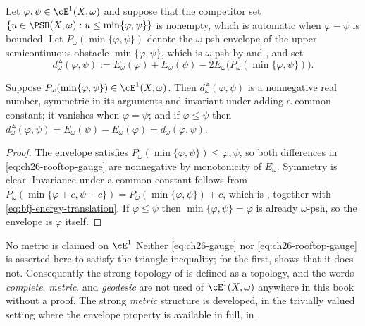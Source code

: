 \begin{definition}
\label{def:ch26-rooftop-gauge}
Let \(\varphi,\psi\in\cE^1(X,\omega)\) and suppose that the competitor set
\(\{u\in\PSH(X,\omega):u\leq\min\{\varphi,\psi\}\}\) is nonempty, which is
automatic when \(\varphi-\psi\) is bounded.  Let
\(P_\omega(\min\{\varphi,\psi\})\) denote the \(\omega\)-psh envelope of the
upper semicontinuous obstacle \(\min\{\varphi,\psi\}\), which is
\(\omega\)-psh by  and
, and set
\begin{equation}
\label{eq:ch26-rooftop-gauge}
 d_\omega^{\,\vartriangle}(\varphi,\psi)
 :=E_\omega(\varphi)+E_\omega(\psi)
   -2E_\omega\bigl(P_\omega(\min\{\varphi,\psi\})\bigr).
\end{equation}
\end{definition}

\begin{proposition}
\label{prop:ch26-rooftop-elementary}
Suppose \(P_\omega(\min\{\varphi,\psi\})\in\cE^1(X,\omega)\).  Then
\(d^{\,\vartriangle}_\omega(\varphi,\psi)\) is a nonnegative real number,
symmetric in its arguments and invariant under adding a common constant; it
vanishes when \(\varphi=\psi\); and if \(\varphi\leq\psi\) then
\(d^{\,\vartriangle}_\omega(\varphi,\psi)=E_\omega(\psi)-E_\omega(\varphi)
=d_\omega(\varphi,\psi)\).
\end{proposition}

\begin{proof}
The envelope satisfies \(P_\omega(\min\{\varphi,\psi\})\leq\varphi,\psi\), so
both differences in \eqref{eq:ch26-rooftop-gauge} are nonnegative by
monotonicity of \(E_\omega\).  Symmetry is clear.  Invariance under a common
constant follows from
\(P_\omega(\min\{\varphi+c,\psi+c\})=P_\omega(\min\{\varphi,\psi\})+c\), which
is , together with
\eqref{eq:bfj-energy-translation}.  If \(\varphi\leq\psi\) then
\(\min\{\varphi,\psi\}=\varphi\) is already \(\omega\)-psh, so the envelope is
\(\varphi\) itself.
\end{proof}

\begin{warning}{No metric is claimed on \(\cE^1\)}
Neither \eqref{eq:ch26-gauge} nor \eqref{eq:ch26-rooftop-gauge} is asserted
here to satisfy the triangle inequality; for the first,
 shows that it does not.  Consequently the
strong topology of  is defined as a topology, and the
words \emph{complete}, \emph{metric}, and \emph{geodesic} are not used of
\(\cE^1(X,\omega)\) anywhere in this book without a proof.  The strong
\emph{metric} structure is developed, in the trivially valued setting where
the envelope property is available in full, in
.
\end{warning}

